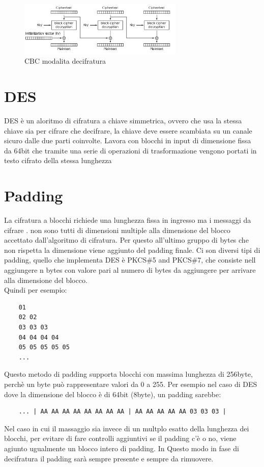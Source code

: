 \begin{figure}[h!]
    \includegraphics[width=0.7\textwidth]{img/CBC_decr.png}
    \centering
    \caption{CBC modalita decifratura}
    \label{fig:cbc_decr}
\end{figure}

\section{DES}
DES è un aloritmo di cifratura a chiave simmetrica, ovvero che usa la stessa chiave sia per cifrare che decifrare, 
la chiave deve essere scambiata su un canale sicuro dalle due parti coinvolte.
Lavora con blocchi in input di dimensione fissa da 64bit che tramite una serie di operazioni di trasformazione vengono 
portati in testo cifrato della stessa lunghezza
\section{Padding}
La cifratura a blocchi richiede una lunghezza fissa in ingresso ma i messaggi da cifrare 
. non sono tutti di dimensioni multiple alla dimensione del blocco accettato dall'algoritmo di cifratura. 
Per questo all'ultimo gruppo di bytes che non rispetta la dimensione viene aggiunto del padding finale.
Ci son diversi tipi di padding, quello che implementa DES è PKCS\#5 and PKCS\#7, che consiste nell aggiungere n bytes con valore pari al numero di bytes da aggiungere per arrivare alla dimensione del blocco. 
\\Quindi per esempio:

\begin{verbatim}
    01
    02 02
    03 03 03
    04 04 04 04
    05 05 05 05 05
    ...
\end{verbatim}
Questo metodo di padding supporta blocchi con massima lunghezza di 256byte, perchè un byte può rappresentare valori da 0 a 255.
Per esempio nel caso di DES dove la dimensione del blocco è di 64bit (8byte), un padding sarebbe:

\begin{verbatim}
    ... | AA AA AA AA AA AA AA AA | AA AA AA AA AA 03 03 03 |
\end{verbatim}
Nel caso in cui il massaggio sia invece di un multplo esatto della lunghezza dei blocchi, per evitare di fare controlli aggiuntivi se il padding c'è o no, viene agiunto ugualmente un blocco intero di padding. In Questo modo in fase di decifratura il padding sarà sempre presente e sempre da rimuovere.
